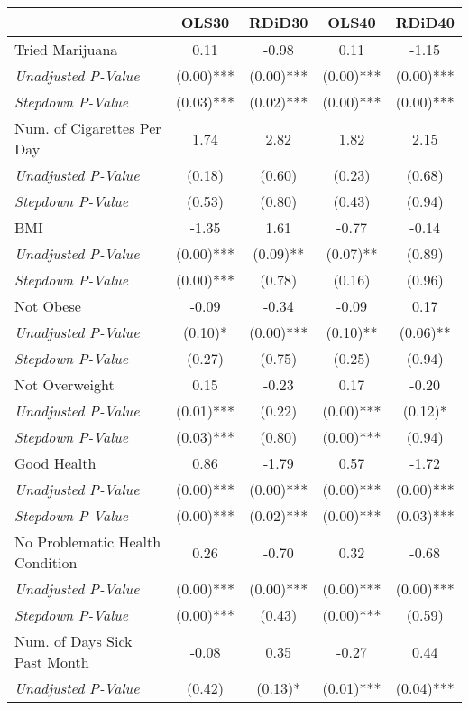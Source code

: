 \begin{tabular}{l c c c c}
\toprule
 & OLS30 & RDiD30 & OLS40 & RDiD40 \\
\midrule
Tried Marijuana & 0.11 & -0.98 & 0.11 & -1.15 \\
\quad \textit{Unadjusted P-Value} & (0.00)*** & (0.00)*** & (0.00)*** & (0.00)*** \\
\quad \textit{Stepdown P-Value} & (0.03)*** & (0.02)*** & (0.00)*** & (0.00)*** \\
Num. of Cigarettes Per Day & 1.74 & 2.82 & 1.82 & 2.15 \\
\quad \textit{Unadjusted P-Value} & (0.18) & (0.60) & (0.23) & (0.68) \\
\quad \textit{Stepdown P-Value} & (0.53) & (0.80) & (0.43) & (0.94) \\
BMI & -1.35 & 1.61 & -0.77 & -0.14 \\
\quad \textit{Unadjusted P-Value} & (0.00)*** & (0.09)** & (0.07)** & (0.89) \\
\quad \textit{Stepdown P-Value} & (0.00)*** & (0.78) & (0.16) & (0.96) \\
Not Obese & -0.09 & -0.34 & -0.09 & 0.17 \\
\quad \textit{Unadjusted P-Value} & (0.10)* & (0.00)*** & (0.10)** & (0.06)** \\
\quad \textit{Stepdown P-Value} & (0.27) & (0.75) & (0.25) & (0.94) \\
Not Overweight & 0.15 & -0.23 & 0.17 & -0.20 \\
\quad \textit{Unadjusted P-Value} & (0.01)*** & (0.22) & (0.00)*** & (0.12)* \\
\quad \textit{Stepdown P-Value} & (0.03)*** & (0.80) & (0.00)*** & (0.94) \\
Good Health & 0.86 & -1.79 & 0.57 & -1.72 \\
\quad \textit{Unadjusted P-Value} & (0.00)*** & (0.00)*** & (0.00)*** & (0.00)*** \\
\quad \textit{Stepdown P-Value} & (0.00)*** & (0.02)*** & (0.00)*** & (0.03)*** \\
No Problematic Health Condition & 0.26 & -0.70 & 0.32 & -0.68 \\
\quad \textit{Unadjusted P-Value} & (0.00)*** & (0.00)*** & (0.00)*** & (0.00)*** \\
\quad \textit{Stepdown P-Value} & (0.00)*** & (0.43) & (0.00)*** & (0.59) \\
Num. of Days Sick Past Month & -0.08 & 0.35 & -0.27 & 0.44 \\
\quad \textit{Unadjusted P-Value} & (0.42) & (0.13)* & (0.01)*** & (0.04)*** \\

\end{tabular}
